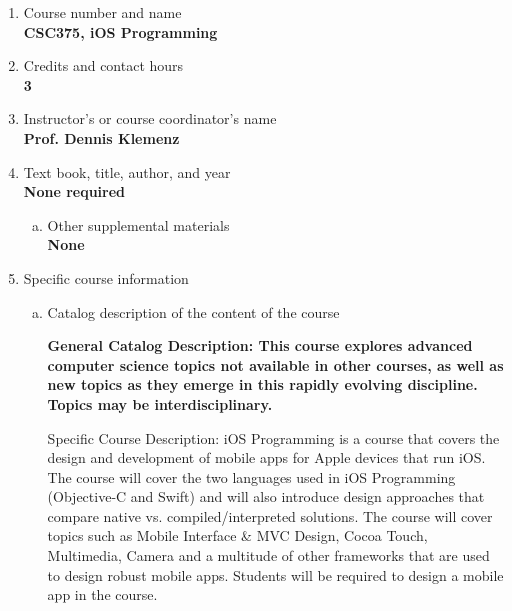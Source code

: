 \label{CSC375-iOS}  %
\begin{enumerate}[1.]
\item Course number and name\\
  {\bfseries
    CSC375, iOS Programming
  }

\item Credits and contact hours\\
  {\bfseries
    3
  }

\item Instructor's or course coordinator's name\\
  {\bfseries
    Prof. Dennis Klemenz
  }

\item Text book, title, author, and year\\
  {\bfseries
    None required
  }
\begin{enumerate}[a.]
\item Other supplemental materials\\
  {\bfseries
    None
  }
\end{enumerate}

\item Specific course information
\begin{enumerate}[a.]
\item Catalog description of the content of the course\\
  {\bfseries
General Catalog Description: This course explores advanced computer science topics not available in other courses, as well as new topics as they emerge in this rapidly evolving discipline. Topics may be interdisciplinary.

Specific Course Description: iOS Programming is a course that covers the
design and development of mobile apps for Apple devices that run iOS.  The
course will cover the two languages used in iOS Programming (Objective-C and
Swift) and will also introduce design approaches that compare native vs.
compiled/interpreted solutions.  The course will cover topics such as Mobile
Interface \& MVC Design, Cocoa Touch, Multimedia, Camera and a multitude of
other frameworks that are used to design robust mobile apps.  Students will be
required to design a mobile app in the course.
  }


\end{enumerate}
\end{enumerate}

